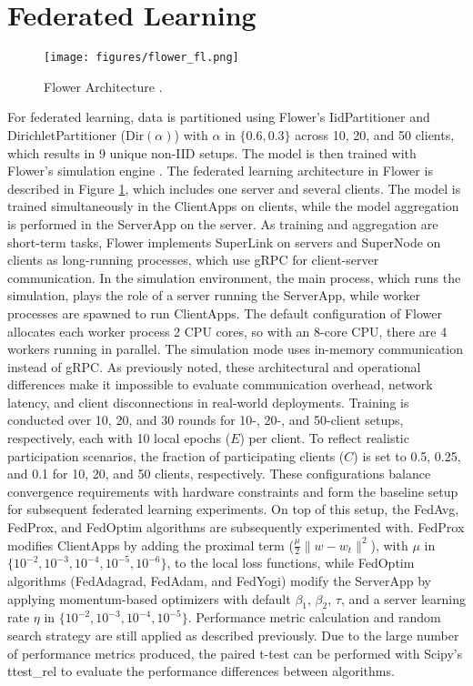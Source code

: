 \section{Federated Learning}

\begin{figure}[h]
    \centering
    \texttt{[image: figures/flower\_fl.png]}
    \caption{Flower Architecture \citep{flower-architecture}.}
    \label{fig:flower_fl}
\end{figure}

For federated learning, data is partitioned using Flower's IidPartitioner \citep{iid_partitioner} and DirichletPartitioner \citep{dirichlet_partitioner} ($\text{Dir}(\alpha)$) with $\alpha$ in $\{0.6, 0.3\}$ across 10, 20, and 50 clients, which results in 9 unique non-IID setups. The model is then trained with Flower's simulation engine \citep{flower-simulation}. The federated learning architecture in Flower is described in Figure \ref{fig:flower_fl}, which includes one server and several clients. The model is trained simultaneously in the ClientApps on clients, while the model aggregation is performed in the ServerApp on the server. As training and aggregation are short-term tasks, Flower implements SuperLink on servers and SuperNode on clients as long-running processes, which use gRPC for client-server communication. In the simulation environment, the main process, which runs the simulation, plays the role of a server running the ServerApp, while worker processes are spawned to run ClientApps. The default configuration of Flower allocates each worker process 2 CPU cores, so with an 8-core CPU, there are 4 workers running in parallel. The simulation mode uses in-memory communication instead of gRPC. As previously noted, these architectural and operational differences make it impossible to evaluate communication overhead, network latency, and client disconnections in real-world deployments. Training is conducted over 10, 20, and 30 rounds for 10-, 20-, and 50-client setups, respectively, each with 10 local epochs ($E$) per client. To reflect realistic participation scenarios, the fraction of participating clients ($C$) is set to 0.5, 0.25, and 0.1 for 10, 20, and 50 clients, respectively. These configurations balance convergence requirements with hardware constraints and form the baseline setup for subsequent federated learning experiments. On top of this setup, the FedAvg, FedProx, and FedOptim algorithms are subsequently experimented with. FedProx modifies ClientApps by adding the proximal term ($\frac{\mu}{2} \lVert w - w_t \rVert^{2}$), with $\mu$ in $\{10^{-2}, 10^{-3}, 10^{-4}, 10^{-5}, 10^{-6}\}$, to the local loss functions, while FedOptim algorithms (FedAdagrad, FedAdam, and FedYogi) modify the ServerApp by applying momentum-based optimizers with default $\beta_1$, $\beta_2$, $\tau$, and a server learning rate $\eta$ in $\{10^{-2}, 10^{-3}, 10^{-4}, 10^{-5}\}$. Performance metric calculation and random search strategy are still applied as described previously. Due to the large number of performance metrics produced, the paired t-test can be performed with Scipy's ttest\_rel \citep{scipyttp} to evaluate the performance differences between algorithms.

